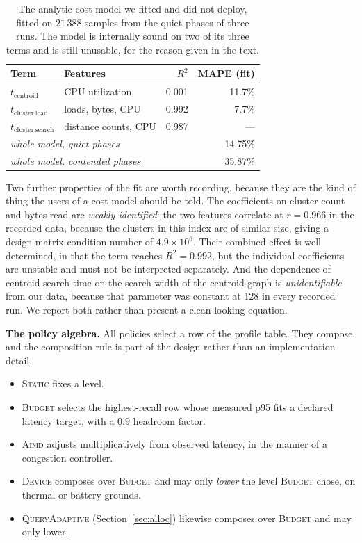 \documentclass[journal]{IEEEtran}
\begin{document}
\begin{table}[!t]
\caption{The analytic cost model we fitted and did not deploy, fitted on
$21\,388$ samples from the quiet phases of three runs. The model is
internally sound on two of its three terms and is still unusable, for the
reason given in the text.}
\label{tab:costmodel}
\centering
\begin{tabular}{llrr}
\toprule
Term & Features & $R^2$ & MAPE (fit) \\
\midrule
$t_{\mathrm{centroid}}$ & CPU utilization & 0.001 & 11.7\% \\
$t_{\mathrm{cluster\ load}}$ & loads, bytes, CPU & 0.992 & 7.7\% \\
$t_{\mathrm{cluster\ search}}$ & distance counts, CPU & 0.987 & --- \\
\midrule
\multicolumn{2}{l}{\emph{whole model, quiet phases}} & & 14.75\% \\
\multicolumn{2}{l}{\emph{whole model, contended phases}} & & 35.87\% \\
\bottomrule
\end{tabular}
\end{table}

Two further properties of the fit are worth recording, because they are the
kind of thing the users of a cost model should be told. The coefficients on
cluster count and bytes read are \emph{weakly identified}: the two features
correlate at $r = 0.966$ in the recorded data, because the clusters in this
index are of similar size, giving a design-matrix condition number of
$4.9\times10^{6}$. Their combined effect is well determined, in that the
term reaches $R^2 = 0.992$, but the individual coefficients are unstable
and must not be interpreted separately. And the dependence of centroid
search time on the search width of the centroid graph is
\emph{unidentifiable} from our data, because that parameter was constant at
$128$ in every recorded run. We report both rather than present a
clean-looking equation.

\textbf{The policy algebra.} All policies select a row of the profile
table. They compose, and the composition rule is part of the design rather
than an implementation detail.

\begin{itemize}
\item \textsc{Static} fixes a level.
\item \textsc{Budget} selects the highest-recall row whose measured p95
fits a declared latency target, with a $0.9$ headroom factor.
\item \textsc{Aimd} adjusts multiplicatively from observed latency, in the
manner of a congestion controller.
\item \textsc{Device} composes over \textsc{Budget} and may only
\emph{lower} the level \textsc{Budget} chose, on thermal or battery
grounds.
\item \textsc{QueryAdaptive} (Section~\ref{sec:alloc}) likewise composes
over \textsc{Budget} and may only lower.
\end{itemize}
\end{document}
